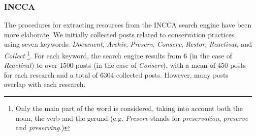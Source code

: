 \subsubsection*{INCCA}
The procedures for extracting resources from the INCCA search engine have been more elaborate. We initially collected posts related to conservation practices using seven keywords: \textit{Document}, \textit{Archiv}, \textit{Preserv}, \textit{Conserv}, \textit{Restor}, \textit{Reactivat}, and \textit{Collect}
\footnote{Only the main part of the word is considered, taking into account both the noun, the verb and the gerund (e.g. \textit{Preserv} stands for \textit{preservation}, \textit{preserve} and \textit{preserving}.)
}.
 For each keyword, the search engine results from 6 (in the case of \textit{Reactivat}) to over 1500 posts (in the case of \textit{Conserv}), with a mean of 450 posts for each research and a total of 6304 collected posts. However, many posts overlap with each research.\\
